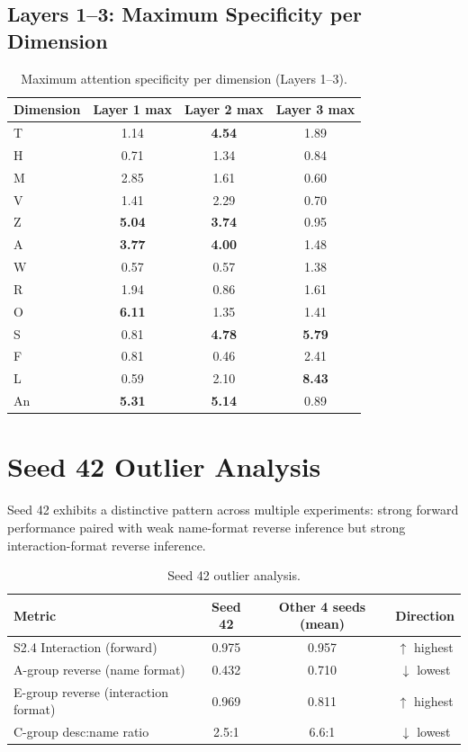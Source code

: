\documentclass{article}
\begin{document}
\subsection{Layers 1--3: Maximum Specificity per Dimension}

\begin{table}[htbp]
\centering
\small
\caption{Maximum attention specificity per dimension (Layers 1--3).}
\label{tab:attention_l123}
\begin{tabular}{lccc}
\toprule
Dimension & Layer 1 max & Layer 2 max & Layer 3 max \\
\midrule
T & 1.14 & \textbf{4.54} & 1.89 \\
H & 0.71 & 1.34 & 0.84 \\
M & 2.85 & 1.61 & 0.60 \\
V & 1.41 & 2.29 & 0.70 \\
Z & \textbf{5.04} & \textbf{3.74} & 0.95 \\
A & \textbf{3.77} & \textbf{4.00} & 1.48 \\
W & 0.57 & 0.57 & 1.38 \\
R & 1.94 & 0.86 & 1.61 \\
O & \textbf{6.11} & 1.35 & 1.41 \\
S & 0.81 & \textbf{4.78} & \textbf{5.79} \\
F & 0.81 & 0.46 & 2.41 \\
L & 0.59 & 2.10 & \textbf{8.43} \\
An & \textbf{5.31} & \textbf{5.14} & 0.89 \\
\bottomrule
\end{tabular}
\end{table}

\section{Seed 42 Outlier Analysis}

Seed 42 exhibits a distinctive pattern across multiple experiments: strong forward performance paired with weak name-format reverse inference but strong interaction-format reverse inference.

\begin{table}[htbp]
\centering
\small
\caption{Seed 42 outlier analysis.}
\label{tab:seed42}
\begin{tabular}{lccc}
\toprule
Metric & Seed 42 & Other 4 seeds (mean) & Direction \\
\midrule
S2.4 Interaction (forward) & 0.975 & 0.957 & $\uparrow$ highest \\
A-group reverse (name format) & 0.432 & 0.710 & $\downarrow$ lowest \\
E-group reverse (interaction format) & 0.969 & 0.811 & $\uparrow$ highest \\
C-group desc:name ratio & 2.5:1 & 6.6:1 & $\downarrow$ lowest \\
\bottomrule
\end{tabular}
\end{table}
\end{document}
